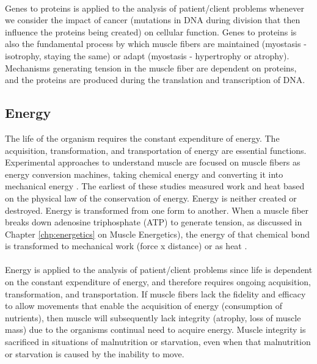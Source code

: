 \paragraph{}
Genes to proteins is applied to the analysis of patient/client problems whenever we consider the impact of cancer (mutations in DNA during division that then influence the proteins being created) on cellular function. Genes to proteins is also the fundamental process by which muscle fibers are maintained (myostasis - isotrophy, staying the same) or adapt (myostasis - hypertrophy or atrophy). Mechanisms generating tension in the muscle fiber are dependent on proteins, and the proteins are produced during the translation and transcription of DNA. 

\subsection{Energy}
The life of the organism requires the constant expenditure of energy. The acquisition, transformation, and transportation of energy are essential functions. Experimental approaches to understand muscle are focused on muscle fibers as energy conversion machines, taking chemical energy and converting it into mechanical energy \cite{woledge_energetic_1985}. 
The earliest of these studies measured work and heat based on the physical law of the conservation of energy. Energy is neither created or destroyed. Energy is transformed from one form to another. When a muscle fiber breaks down adenosine triphosphate (ATP) to generate tension, as discussed in Chapter \ref{chp:energetics} on Muscle Energetics), the energy of that chemical bond is transformed to mechanical work (force x distance) or as heat \cite{hill_heat_1938}.

\paragraph{}
Energy is applied to the analysis of patient/client problems since life is dependent on the constant expenditure of energy, and therefore requires ongoing acquisition, transformation, and transportation. If muscle fibers lack the fidelity and efficacy to allow movements that enable the acquisition of energy (consumption of nutrients), then muscle will subsequently lack integrity (atrophy, loss of muscle mass) due to the organisms continual need to acquire energy. Muscle integrity is sacrificed in situations of malnutrition or starvation, even when that malnutrition or starvation is caused by the inability to move. 


